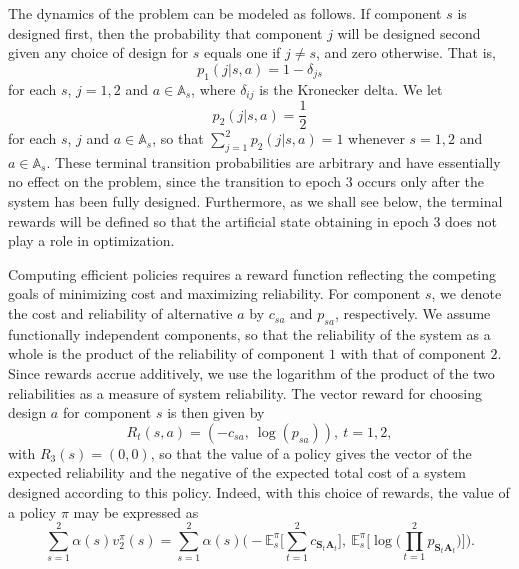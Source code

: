 \documentclass{article}
\theoremstyle{definition}
\numberwithin{equation}{section}
\begin{document}
The dynamics of the problem can be modeled as follows. If component $s$ is designed first, then the probability that component $j$ will be designed second given any choice of design for $s$ equals one if $j \neq s$, and zero otherwise. That is, 
\begin{equation*}
p_1(j | s, a) = 1 - \delta_{js}
\end{equation*} 
for each $s$, $j = 1, 2$ and $a \in \mathbb{A}_s$, where $\delta_{ij}$ is the Kronecker delta. 
We let %
\begin{equation*}
p_2(j|s, a) = \frac{1}{2}
\end{equation*} 
for each $s$, $j$ and $a \in \mathbb{A}_s$, so that $\sum_{j = 1}^{2}p_2(j | s, a) = 1$ whenever $s = 1, 2$ and $a \in \mathbb{A}_s$. These terminal transition probabilities are arbitrary and have essentially no effect on the problem, since the transition to epoch $3$ occurs only after the system has been fully designed. Furthermore, as we shall see below, the terminal rewards will be defined so that the artificial state obtaining in epoch $3$ does not play a role in optimization.
  
Computing efficient policies requires a reward function reflecting the competing goals of minimizing cost and maximizing reliability. For component $s$, we denote the cost and reliability of alternative $a$ by $c_{sa}$ and $p_{sa}$, respectively. We assume functionally independent components, so that the reliability of the system as a whole is the product of the reliability of component $1$ with that of component $2$. Since rewards accrue additively, we use the logarithm of the product of the two reliabilities as a measure of system reliability. 
The vector reward for choosing design $a$ for component $s$ is then given by
\begin{equation*}
R_t(s, a) = (-c_{sa},\ \log(p_{sa})),\ t = 1, 2,
\end{equation*} with $R_3(s) = (0, 0)$, so that the value of a policy gives the vector of the expected reliability and the negative of the expected total cost of a system designed according to this policy. Indeed, with this choice of rewards, the value of a policy $\pi$ may be expressed as
\begin{equation*}
\sum_{s = 1}^{2}\alpha(s)v_2^{\pi}(s) = \sum_{s = 1}^{2}\alpha(s)\Biggl(-\mathbb{E}_{s}^{\pi}\biggl[\sum_{t = 1}^{2}c_{\textbf{S}_t\textbf{A}_t}\biggr],\ \mathbb{E}_{s}^{\pi}\biggl[\log\biggl(\prod_{t = 1}^{2}p_{\textbf{S}_t\textbf{A}_t}\biggr)\biggr]\Biggr).
\end{equation*} 
\end{document}
